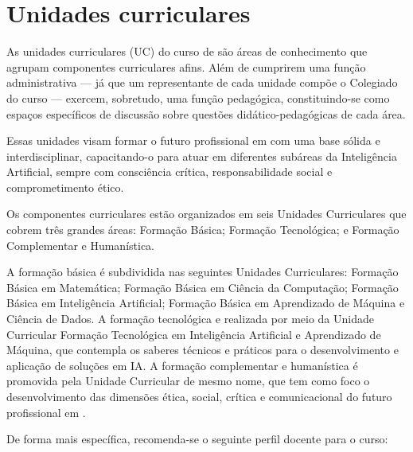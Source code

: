 \section{Unidades curriculares}
\label{sec:unidades-curriculares}

As unidades curriculares (UC) do curso de \nomedocurso são áreas de conhecimento que agrupam componentes curriculares afins. Além de cumprirem uma função administrativa — já que um representante de cada unidade compõe o Colegiado do curso — exercem, sobretudo, uma função pedagógica, constituindo-se como espaços específicos de discussão sobre questões didático-pedagógicas de cada área.

Essas unidades visam formar o futuro profissional em \nomedocurso com uma base sólida e interdisciplinar, capacitando-o para atuar em diferentes subáreas da Inteligência Artificial, sempre com consciência crítica, responsabilidade social e comprometimento ético.

Os componentes curriculares estão organizados em seis Unidades Curriculares que cobrem três grandes áreas: Formação Básica; Formação Tecnológica; e Formação Complementar e Humanística.

A formação básica é subdividida nas seguintes Unidades Curriculares: Formação Básica em Matemática; Formação Básica em Ciência da Computação; Formação Básica em Inteligência Artificial; Formação Básica em Aprendizado de Máquina e Ciência de Dados. 
%
A formação tecnológica e realizada por meio da Unidade Curricular Formação Tecnológica em Inteligência Artificial e Aprendizado de Máquina, que contempla os saberes técnicos e práticos para o desenvolvimento e aplicação de soluções em IA. 
%
A formação complementar e humanística é promovida pela Unidade Curricular de mesmo nome, que tem como foco o desenvolvimento das dimensões ética, social, crítica e comunicacional do futuro profissional em \nomedocurso.

De forma mais específica, recomenda-se o seguinte perfil docente para o curso:

